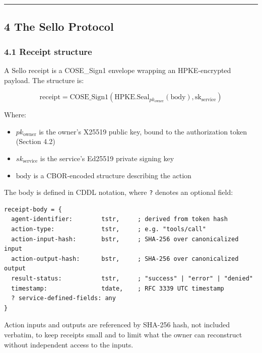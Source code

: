 \documentclass[
  11pt,
]{article}
\providecommand{\tightlist}{%
  \setlength{\itemsep}{0pt}\setlength{\parskip}{0pt}}
\begin{document}
\begin{center}\rule{0.5\linewidth}{0.5pt}\end{center}

\hypertarget{the-sello-protocol}{%
\subsection{4 The Sello Protocol}\label{the-sello-protocol}}

\hypertarget{receipt-structure}{%
\subsubsection{4.1 Receipt structure}\label{receipt-structure}}

A Sello receipt is a COSE\_Sign1 envelope wrapping an HPKE-encrypted
payload. The structure is:

\[\text{receipt} = \text{COSE\_Sign1}(\text{HPKE.Seal}_{pk_{\text{owner}}}(\text{body}), \text{sk}_{\text{service}})\]

Where:

\begin{itemize}
\tightlist
\item
  \(pk_{\text{owner}}\) is the owner's X25519 public key, bound to the
  authorization token (Section 4.2)
\item
  \(sk_{\text{service}}\) is the service's Ed25519 private signing key
\item
  \(\text{body}\) is a CBOR-encoded structure describing the action
\end{itemize}

The body is defined in CDDL \citep{RFC8610} notation, where \texttt{?}
denotes an optional field:

\begin{verbatim}
receipt-body = {
  agent-identifier:        tstr,     ; derived from token hash
  action-type:             tstr,     ; e.g. "tools/call"
  action-input-hash:       bstr,     ; SHA-256 over canonicalized input
  action-output-hash:      bstr,     ; SHA-256 over canonicalized output
  result-status:           tstr,     ; "success" | "error" | "denied"
  timestamp:               tdate,    ; RFC 3339 UTC timestamp
  ? service-defined-fields: any
}
\end{verbatim}

Action inputs and outputs are referenced by SHA-256 hash, not included
verbatim, to keep receipts small and to limit what the owner can
reconstruct without independent access to the inputs.
\end{document}

